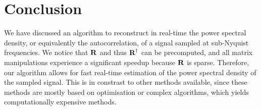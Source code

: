 \documentclass[a4paper, openany, oneside]{memoir}
\begin{document}
\section{Conclusion}
We have discussed an algorithm to reconstruct in real-time the power spectral density, or equivalently the autocorrelation, of a signal sampled at sub-Nyquist frequencies. We notice that $\boldsymbol{\mathbf{R}}$ and thus $\boldsymbol{\mathbf{R}}^\dagger$ can be precomputed, and all matrix manipulations experience a significant speedup because $\boldsymbol{\mathbf{R}}$ is sparse. Therefore, our algorithm allows for fast real-time estimation of the power spectral density of the sampled signal. This is in constrast to other methods available, since these methods are mostly based on optimisation or complex algorithms, which yields computationally expensive methods.
\end{document}

